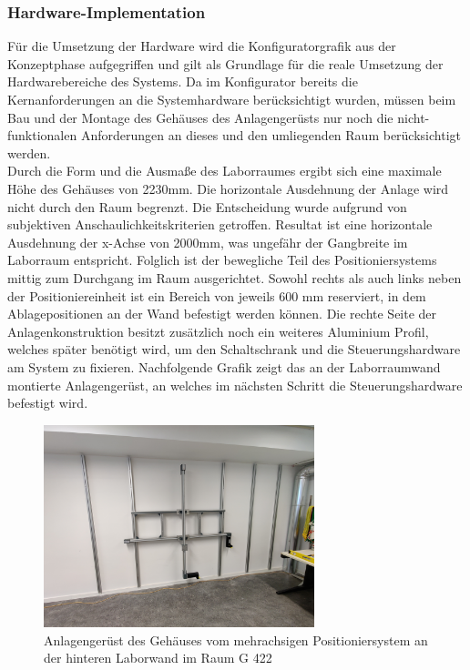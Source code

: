 \documentclass[../../../Bachelorarbeit.tex]{subfiles}
\begin{document}
\subsubsection{Hardware-Implementation} \label{Hardwareimp}
Für die Umsetzung der Hardware wird die Konfiguratorgrafik aus der Konzeptphase aufgegriffen und gilt als Grundlage für die reale Umsetzung der Hardwarebereiche des Systems. Da im Konfigurator bereits die Kernanforderungen an die Systemhardware berücksichtigt wurden, müssen beim Bau und der Montage des Gehäuses \bzw des Anlagengerüsts nur noch die nicht-funktionalen Anforderungen an dieses und den umliegenden Raum berücksichtigt werden.\\
Durch die Form und die Ausmaße des Laborraumes ergibt sich eine maximale Höhe des Gehäuses von 2230\si{\mm}. Die horizontale Ausdehnung der Anlage wird nicht durch den Raum begrenzt. Die Entscheidung wurde aufgrund von subjektiven Anschaulichkeitskriterien getroffen. Resultat ist eine horizontale Ausdehnung der x-Achse von 2000\si{\mm}, was ungefähr der Gangbreite im Laborraum entspricht. Folglich ist der bewegliche Teil des Positioniersystems mittig zum Durchgang im Raum ausgerichtet. Sowohl rechts als auch links neben der Positioniereinheit ist ein Bereich von jeweils 600 \si{\mm} reserviert, in dem Ablagepositionen an der Wand befestigt werden können. Die rechte Seite der Anlagenkonstruktion besitzt zusätzlich noch ein weiteres Aluminium Profil, welches später benötigt wird, um den Schaltschrank und die Steuerungshardware am System zu fixieren. Nachfolgende Grafik zeigt das an der Laborraumwand montierte Anlagengerüst, an welches im nächsten Schritt die Steuerungshardware befestigt wird.

\begin{figure}[H]
    \centering
    \includegraphics[width=0.7\textwidth]{Images/Anlagengeruest.jpg}
    \caption[Anlagengerüst]{Anlagengerüst des Gehäuses vom mehrachsigen Positioniersystem an der hinteren Laborwand im Raum G 422}
    \label{fig:my-img20}
\end{figure}
\end{document}
